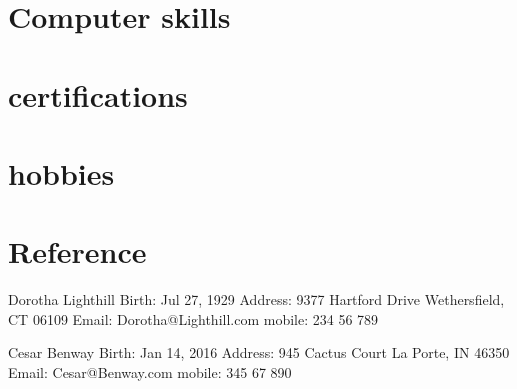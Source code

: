 \documentclass{crudecv/crudecv}
\begin{document}
\section{Computer skills}

\section{certifications}

\section{hobbies}

\section{Reference}
Dorotha Lighthill
Birth: Jul 27, 1929
Address: 9377 Hartford Drive Wethersfield, CT 06109
Email: Dorotha@Lighthill.com
mobile: 234 56 789

Cesar Benway
Birth: Jan 14, 2016
Address: 945 Cactus Court La Porte, IN 46350
Email: Cesar@Benway.com
mobile: 345 67 890
\end{document}

